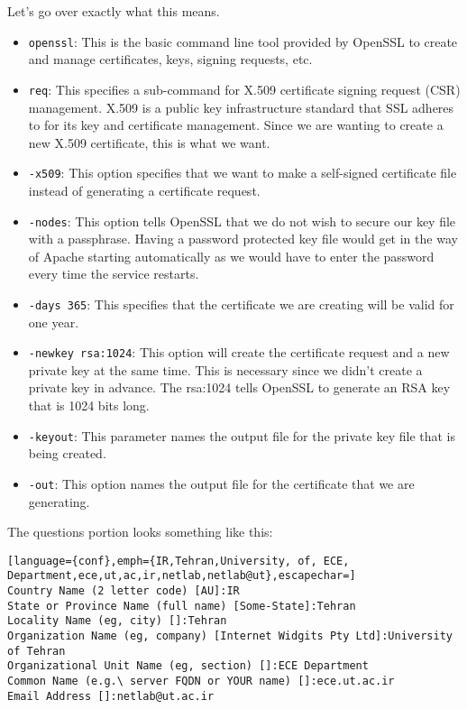 \documentclass{../UTNetLab}
\begin{document}
        Let's go over exactly what this means.

        \begin{itemize}
            \item \lstinline{openssl}: This is the basic command line tool provided by OpenSSL to create and manage certificates, keys, signing requests, etc.
            \item \lstinline{req}: This specifies a sub-command for X.509 certificate signing request (CSR) management.
                X.509 is a public key infrastructure standard that SSL adheres to for its key and certificate management.
                Since we are wanting to create a new X.509 certificate, this is what we want.
            \item \lstinline{-x509}: This option specifies that we want to make a self-signed certificate file instead of generating a certificate request.
            \item \lstinline{-nodes}: This option tells OpenSSL that we do not wish to secure our key file with a passphrase.
                Having a password protected key file would get in the way of Apache starting automatically as we would have to enter the password every time the service restarts.
            \item \lstinline{-days 365}: This specifies that the certificate we are creating will be valid for one year.
            \item \lstinline{-newkey rsa:1024}: This option will create the certificate request and a new private key at the same time.
                This is necessary since we didn't create a private key in advance.
                The rsa:1024 tells OpenSSL to generate an RSA key that is 1024 bits long.
            \item \lstinline{-keyout}: This parameter names the output file for the private key file that is being created.
            \item \lstinline{-out}: This option names the output file for the certificate that we are generating.
        \end{itemize}

    The questions portion looks something like this:
    {\small
    \begin{lstlisting}[language={conf},emph={IR,Tehran,University, of, ECE, Department,ece,ut,ac,ir,netlab,netlab@ut},escapechar=]
Country Name (2 letter code) [AU]:IR 
State or Province Name (full name) [Some-State]:Tehran 
Locality Name (eg, city) []:Tehran 
Organization Name (eg, company) [Internet Widgits Pty Ltd]:University of Tehran 
Organizational Unit Name (eg, section) []:ECE Department 
Common Name (e.g.\ server FQDN or YOUR name) []:ece.ut.ac.ir
Email Address []:netlab@ut.ac.ir
    \end{lstlisting}}
\end{document}
